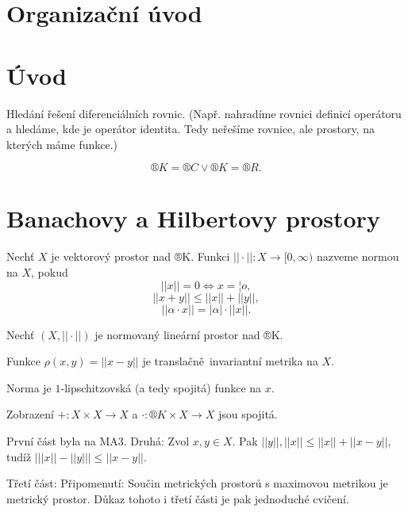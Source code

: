 \documentclass[12pt]{article}					%
\begin{document}

\section*{Organizační úvod}
\section*{Úvod}

\begin{poznamka}[Motivace]
	Hledání řešení diferenciálních rovnic. (Např. nahradíme rovnici definicí operátoru a hledáme, kde je operátor identita. Tedy neřešíme rovnice, ale prostory, na kterých máme funkce.)
\end{poznamka}

\begin{definice}
	$$ ®K = ®C \lor ®K = ®R. $$ 
\end{definice}

\section{Banachovy a Hilbertovy prostory}

\begin{definice}
	Nechť $X$ je vektorový prostor nad ®K. Funkci $||·||: X \rightarrow [0, ∞)$ nazveme normou na $X$, pokud
	$$ || x || = 0 \Leftrightarrow x = ¦o, $$
	$$ || x + y || ≤ || x || + || y ||, $$ 
	$$ || \alpha·x || = | \alpha | · || x | |. $$ 
\end{definice}

\begin{tvrzeni}
	Nechť $\left( X, || · || \right) $ je normovaný lineární prostor nad ®K.
	
	Funkce $\rho\left( x, y  \right) = || x - y ||$ je translačně invariantní metrika na $X$.

	Norma  je $1$-lipschitzovská (a tedy spojitá) funkce na $x$.

	Zobrazení $+: X \times X \rightarrow X$ a $·: ®K \times X \rightarrow X$ jsou spojitá.

	\begin{dukazin}
		První část byla na MA3. Druhá: Zvol $x, y \in X$. Pak $||y||, ||x|| ≤ ||x|| + ||x - y||$, tudíž $\left|||x|| - ||y|| \right| ≤ ||x - y||$.

		Třetí část: Připomenutí: Součin metrických prostorů s maximovou metrikou je metrický prostor. Důkaz tohoto i třetí části je pak jednoduché cvičení.
	\end{dukazin}
\end{tvrzeni}
\end{document}
